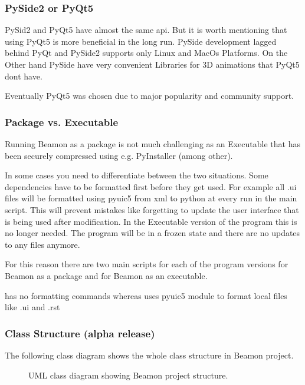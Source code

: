 \documentclass[letterpaper,10pt,english]{sphinxmanual}
\begin{document}
\subsubsection{PySide2 or PyQt5}
\label{\detokenize{implementation:pyside2-or-pyqt5}}
PySid2 and PyQt5 have almost the same api.
But it is worth mentioning that using PyQt5 is more beneficial in the long run.
PySide development lagged behind PyQt and PySide2 supports only Linux and MacOs Platforms.
On the Other hand PySide have very convenient Libraries for 3D animations that PyQt5 dont have.

Eventually PyQt5 was chosen due to major popularity and community support.


\subsubsection{Package vs. Executable}
\label{\detokenize{implementation:package-vs-executable}}
Running Beamon as a package is not much challenging as an Executable that has been securely compressed using
e.g. PyInstaller (among other).

In some cases you need to differentiate between the two situations.
Some dependencies have to be formatted first before they get used. For example all .ui files will be formatted
using pyuic5 from xml to python at every run in the main script. This will prevent mistakes like forgetting
to update the user interface that is being used after modification.
In the Executable version of the program this is no longer needed. The program will be in a frozen state and there
are no updates to any files anymore.

For this reason there are two main scripts for each of the program versions
 for Beamon as a package and  for Beamon as an executable.

 has no formatting commands whereas  uses pyuic5 module to format local files like .ui and
.rst


\subsubsection{Class Structure (alpha release)}
\label{\detokenize{implementation:class-structure-alpha-release}}
The following class diagram shows the whole class structure in Beamon project.

\begin{figure}[htbp]
\centering
\capstart

\noindent{}
\caption{UML class diagram showing Beamon project structure.}\label{\detokenize{implementation:id3}}\end{figure}
\end{document}
